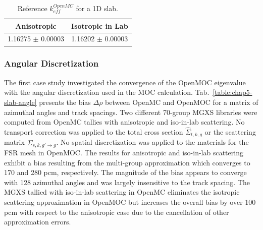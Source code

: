 \begin{table}[h!]
  \centering
  \caption[Reference OpenMC eigenvalues for a 1D slab]{Reference $k^{OpenMC}_{eff}$ for a 1D slab.}
  \small
  \label{table:chap5-slab-reference} 
  \vspace{6pt}
  \begin{tabular}{c c}
  \toprule
  \rowcolor{lightgray}
  {\cellcolor{carolinablue} {\bf Anisotropic}} &
  {\cellcolor{lightgreen} {\bf Isotropic in Lab}} \\
  \midrule
  1.16275 $\pm$ 0.00003 & 1.16202 $\pm$ 0.00003 \\
  \bottomrule
\end{tabular}
\end{table}

\subsubsection{Angular Discretization}
\label{subsubsec:chap5-slab-angle}

The first case study investigated the convergence of the OpenMOC eigenvalue with the angular discretization used in the \ac{MOC} calculation. Tab.~\ref{table:chap5-slab-angle} presents the bias $\Delta\rho$ between OpenMC and OpenMOC for a matrix of azimuthal angles and track spacings. Two different 70-group \ac{MGXS} libraries were computed from OpenMC tallies with anisotropic and iso-in-lab scattering. No transport correction was applied to the total cross section $\hat{\Sigma}_{t,k,g}$ or the scattering matrix $\hat{\Sigma}_{s,k,g'\rightarrow g}$. No spatial discretization was applied to the materials for the \ac{FSR} mesh in OpenMOC. The results for anisotropic and iso-in-lab scattering exhibit a bias resulting from the multi-group approximation which converges to 170 and 280 pcm, respectively. The magnitude of the bias appears to converge with 128 azimuthal angles and was largely insensitive to the track spacing. The \ac{MGXS} tallied with iso-in-lab scattering in OpenMC eliminates the isotropic scattering approximation in OpenMOC but increases the overall bias by over 100 \ac{pcm} with respect to the anisotropic case due to the cancellation of other approximation errors.

